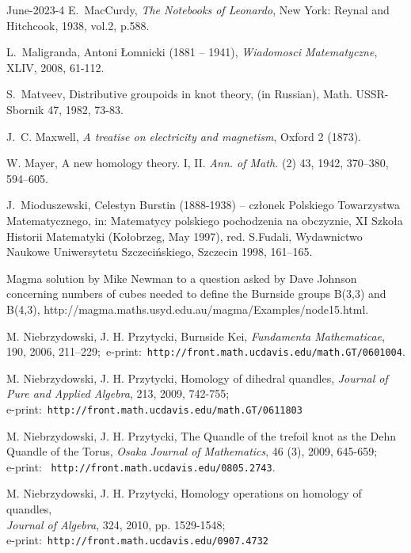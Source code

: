 \documentclass[12pt]{amsart}
\begin{document}
\begin{thebibliography}{June-2023-4}
E.~MacCurdy, {\it The Notebooks of Leonardo},
New York: Reynal and Hitchcook, 1938, vol.2, p.588.

L.~Maligranda, Antoni {\L}omnicki (1881 -- 1941), {\it Wiadomosci Matematyczne}, XLIV, 2008, 61-112.

S.~Matveev, Distributive groupoids in knot theory, (in Russian), Math.
USSR-Sbornik 47, 1982, 73-83.

J.~C. Maxwell, {\it A treatise on electricity and magnetism}, Oxford 2 (1873).

 W. Mayer,
A new homology theory. I, II. {\it Ann. of Math.} (2) 43, 1942, 370–380, 594–605.

J.~Mioduszewski, Celestyn Burstin (1888-1938) -- cz{\l}onek Polskiego Towarzystwa Matematycznego, in:
Matematycy polskiego pochodzenia na obczyznie, XI Szko{\l}a Historii Matematyki (Ko{\l}obrzeg, May 1997),
red. S.Fudali, Wydawnictwo Naukowe Uniwersytetu Szczeci{\'n}skiego, Szczecin 1998, 161--165.

 Magma solution by Mike Newman to a question asked by Dave
Johnson concerning numbers of cubes needed to define the Burnside groups
B(3,3) and B(4,3),\newline
http://magma.maths.usyd.edu.au/magma/Examples/node15.html.

  M. Niebrzydowski, J. H. Przytycki,
Burnside Kei,
{\it Fundamenta Mathematicae}, 190, 2006, 211--229;\ 
e-print:\ {\tt http://front.math.ucdavis.edu/math.GT/0601004}.

  M. Niebrzydowski, J. H. Przytycki,
Homology of dihedral quandles,
{\it Journal of Pure and Applied Algebra}, 213, 2009, 742-755;\\
e-print:\ {\tt  http://front.math.ucdavis.edu/math.GT/0611803}

  M. Niebrzydowski, J. H. Przytycki,
The Quandle of the trefoil knot as the Dehn Quandle of the Torus, {\it Osaka Journal of Mathematics},
46 (3), 2009, 645-659;\\
e-print: \ {\tt http://front.math.ucdavis.edu/0805.2743}.

  M. Niebrzydowski, J. H. Przytycki, 
Homology operations on homology of quandles,\\
{\it Journal of Algebra}, 324, 2010, pp. 1529-1548;\\
e-print:\ {\tt  http://front.math.ucdavis.edu/0907.4732}


\end{thebibliography}
\end{document}
